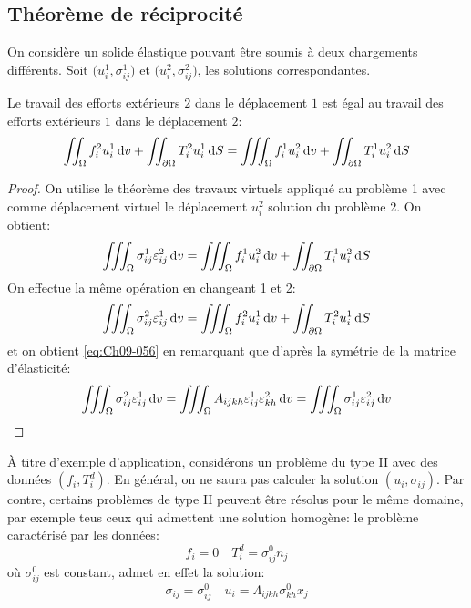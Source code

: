 \subsection{Théorème de réciprocité} \label{ssec:Ch09-2.1}
On considère un solide élastique pouvant être soumis à deux chargements différents.
Soit $\bigl( u_i^1, \sigma_{ij}^1 \bigr)$ et $\bigl( u_i^2, \sigma_{ij}^2 \bigr)$, les solutions correspondantes.

\begin{thm}
    Le travail des efforts extérieurs $2$ dans le déplacement $1$ est égal au travail des efforts extérieurs $1$ dans le déplacement $2$:
    \begin{equation}
        \iint_{\Omega} f_i^2 u_i^1 \mathop{\mathrm{{}d}}\mathopen{} v + \iint_{\partial \Omega} T_i^2 u_i^1 \mathop{\mathrm{{}d}}\mathopen{} S = \iiint_{\Omega} f_i^1 u_i^2 \mathop{\mathrm{{}d}}\mathopen{} v + \iint_{\partial \Omega} T_i^1 u_i^2 \mathop{\mathrm{{}d}}\mathopen{} S
        \label{eq:Ch09-056}
    \end{equation}
\end{thm}
\begin{proof}
    On utilise le théorème des travaux virtuels appliqué au problème 1 avec comme déplacement virtuel le déplacement $u_i^2$ solution du problème 2. 
    On obtient:
    \begin{displaymath}
        \iiint_{\Omega} \sigma_{ij}^1 \varepsilon_{ij}^2 \mathop{\mathrm{{}d}}\mathopen{} v = \iiint_{\Omega} f_i^1 u_i^2 \mathop{\mathrm{{}d}}\mathopen{} v + \iint_{\partial \Omega} T_i^1 u_i^2 \mathop{\mathrm{{}d}}\mathopen{} S
    \end{displaymath}
    On effectue la même opération en changeant 1 et 2: 
    \begin{displaymath}
        \iiint_{\Omega} \sigma_{ij}^2 \varepsilon_{ij}^1 \mathop{\mathrm{{}d}}\mathopen{} v = \iiint_{\Omega} f_i^2 u_i^1 \mathop{\mathrm{{}d}}\mathopen{} v + \iint_{\partial \Omega} T_i^2 u_i^1 \mathop{\mathrm{{}d}}\mathopen{} S
    \end{displaymath}
    et on obtient \eqref{eq:Ch09-056} en remarquant que d'après la symétrie de la matrice d'élasticité: 
    \begin{displaymath}
        \iiint_{\Omega} \sigma_{ij}^2 \varepsilon_{ij}^1 \mathop{\mathrm{{}d}}\mathopen{} v = \iiint_{\Omega} A_{ijkh} \varepsilon_{ij}^1 \varepsilon_{kh}^2 \mathop{\mathrm{{}d}}\mathopen{} v = \iiint_{\Omega} \sigma_{ij}^1 \varepsilon_{ij}^2 \mathop{\mathrm{{}d}}\mathopen{} v
    \end{displaymath}
\end{proof}

À titre d'exemple d'application, considérons un problème du type II avec des données $\left( f_i, T_i^d \right)$.
En général, on ne saura pas calculer la solution $\left( u_i, \sigma_{ij} \right)$.
Par contre, certains problèmes de type II peuvent être résolus pour le même domaine, par exemple teus ceux qui admettent une solution homogène: le problème caractérisé par les données: 
\begin{equation}
    f_i = 0 \quad T_i^d = \sigma_{ij}^0 n_j
    \label{eq:Ch09-057}
\end{equation}
où $\sigma_{ij}^0$ est constant, admet en effet la solution: 
\begin{equation}
    \sigma_{ij} = \sigma_{ij}^0 \quad u_i = \Lambda_{ijkh} \sigma_{kh}^0 x_j
    \label{eq:Ch09-058}
\end{equation}

